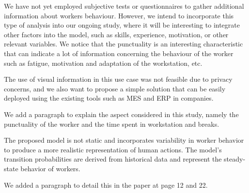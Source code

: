\documentclass[preprint,11pt,3p]{elsarticle}
\begin{document}
\begin{tcolorbox}[colback=r_color1,colframe=r_color2,title=Response to Q13 :]
We have not yet employed subjective tests or questionnaires to gather additional information about workers behaviour. However, we intend to incorporate this type of analysis into our ongoing study, where it will be interesting to integrate other factors into the model, such as skills, experience, motivation, or other relevant variables. We notice that the punctuality is an interesting characteristic that can indicate a lot of information concerning the behaviour of the worker such as fatigue, motivation and adaptation of the workstation, etc. 


The use of visual information in this use case was not feasible due to privacy concerns, and we also want to propose a simple solution that can be easily deployed using the existing tools such as MES and ERP in companies.

We add a paragraph to explain the aspect considered in this study, namely the punctuality of the worker and the time spent in workstation and breaks. 


The proposed model is not static and incorporates variability in worker behavior to produce a more realistic representation of human actions. The model's transition probabilities are derived from historical data and represent the steady-state behavior of workers. 

We added a paragraph to detail this in the paper at page 12 and 22.
		


\end{tcolorbox}
\end{document}
